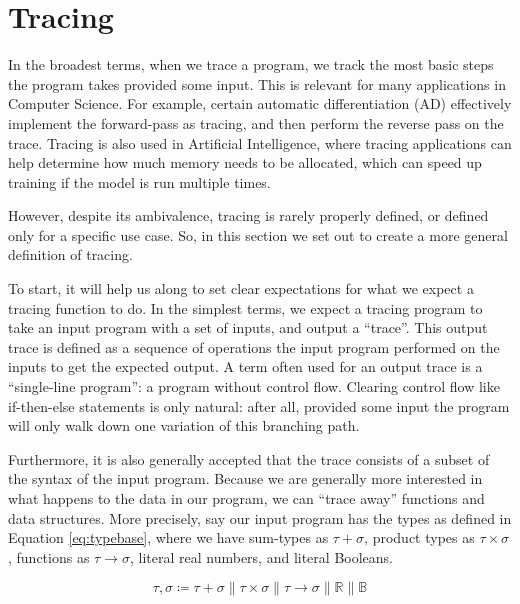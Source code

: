 \section{Tracing}
    In the broadest terms, when we trace a program, we track the most basic steps the program takes provided some input.
    This is relevant for many applications in Computer Science.
    For example, certain automatic differentiation (AD) effectively implement the forward-pass as tracing, and then perform the reverse pass on the trace\cn.
    Tracing is also used in Artificial Intelligence, where tracing applications can help determine how much memory needs to be allocated, which can speed up training if the model is run multiple times\cn.

    However, despite its ambivalence, tracing is rarely properly defined, or defined only for a specific use case.
    So, in this section we set out to create a more general definition of tracing.
    
    To start, it will help us along to set clear expectations for what we expect a tracing function to do.
    In the simplest terms, we expect a tracing program to take an input program with a set of inputs, and output a ``trace''.
    This output trace is defined as a sequence of operations the input program performed on the inputs to get the expected output.
    A term often used for an output trace is a ``single-line program''\cn: a program without control flow.
    Clearing control flow like if-then-else statements is only natural: after all, provided some input the program will only walk down one variation of this branching path.

    Furthermore, it is also generally accepted that the trace consists of a subset of the syntax of the input program.
    Because we are generally more interested in what happens to the data in our program, we can ``trace away'' functions and data structures.
    More precisely, say our input program has the types as defined in Equation \ref{eq:typebase}, where we have sum-types as $\tau+\sigma$, product types as $\tau\times\sigma$, functions as $\tau\to\sigma$, literal real numbers, and literal Booleans.

    \begin{equation}
        \label{eq:typebase}
        \tau,\sigma\coloneqq\tau+\sigma\|\tau\times\sigma\|\tau\to\sigma\|\mathbb{R}\|\mathbb{B}
    \end{equation}

